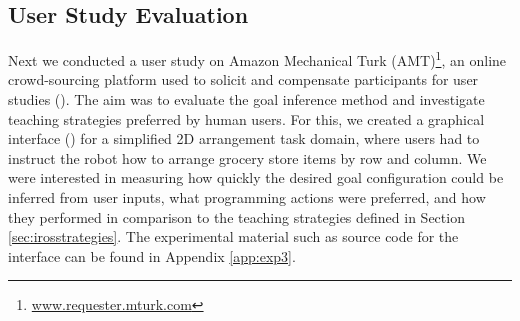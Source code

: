 \subsection{User Study Evaluation}
Next we conducted a user study on Amazon Mechanical Turk (AMT)\footnote{\url{www.requester.mturk.com}}, an online crowd-sourcing platform used to solicit and compensate participants for user studies (\cite{kittur2008crowdsourcing}).
The aim was to evaluate the goal inference method and investigate teaching strategies preferred by human users. 
For this, we created a graphical interface () for a simplified 2D arrangement task domain, where users had to instruct the robot how to arrange grocery store items by row and column.
We were interested in measuring how quickly the desired goal configuration could be inferred from user inputs, what programming actions were preferred, and how they performed in comparison to the teaching strategies defined in Section \ref{sec:irosstrategies}.
The experimental material such as source code for the interface can be found in Appendix \ref{app:exp3}.

